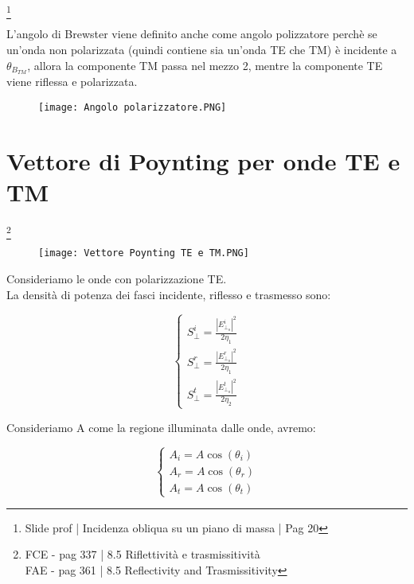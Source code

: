 \footnote{Slide prof | Incidenza obliqua su un piano di massa | Pag 20}

L'angolo di Brewster viene definito anche come angolo polizzatore perchè se un'onda non polarizzata (quindi 
contiene sia un'onda TE che TM) è incidente a $\theta_{B_{TM}}$, allora la componente TM passa nel mezzo 2, 
mentre la componente TE viene riflessa e polarizzata. 


\begin{figure}[h]
    \centering
    \texttt{[image: Angolo polarizzatore.PNG]}
    
\end{figure}  

\newpage

\section{Vettore di Poynting per onde TE e TM} 

\footnote{FCE - pag 337 | 8.5 Riflettività e trasmissitività \\ 
FAE - pag 361 | 8.5 Reflectivity and Trasmissitivity}

\begin{figure}[h]
    \centering
    \texttt{[image: Vettore Poynting TE e TM.PNG]}
    
\end{figure}  

Consideriamo le onde con polarizzazione TE. \\ 

La densità di potenza dei fasci incidente, riflesso e trasmesso sono: 

{\Large \begin{equation}
    \begin{cases}
        S_\perp ^{i} = \frac{\left|E_{\perp_o} ^{i}\right| ^{2}}{2 \eta_1} \\ 
        S_\perp ^{r} = \frac{\left|E_{\perp_o} ^{r}\right| ^{2}}{2 \eta_1} \\ 
        S_\perp ^{t} = \frac{\left|E_{\perp_o} ^{t}\right| ^{2}}{2 \eta_2}
    \end{cases}
\end{equation}}


Consideriamo A come la regione illuminata dalle onde, avremo: 

{\Large \begin{equation}
    \begin{cases}
        A_i = A \cos(\theta_i) \\ 
        A_r = A \cos(\theta_r) \\ 
        A_t = A \cos(\theta_t)  
    \end{cases}
\end{equation}}

